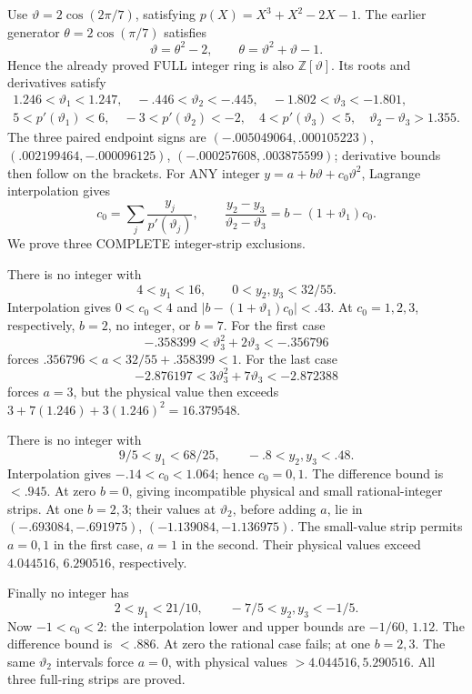 \documentclass[11pt]{article}
\begin{document}
Use \(\vartheta=2\cos(2\pi/7)\), satisfying
\(p(X)=X^3+X^2-2X-1\).
The earlier generator \(\theta=2\cos(\pi/7)\)
satisfies
\[
           \vartheta=\theta^2-2,\qquad
           \theta=\vartheta^2+\vartheta-1 .
\]
Hence the already proved FULL integer ring
is also \(\mathbb Z[\vartheta]\).
Its roots and derivatives satisfy
\[
\begin{gathered}
 1.246<\vartheta_1<1.247,\quad
 -.446<\vartheta_2<-.445,\quad
 -1.802<\vartheta_3<-1.801,\\
 5<p'(\vartheta_1)<6,\quad-3<p'(\vartheta_2)<-2,\quad
 4<p'(\vartheta_3)<5,\quad\vartheta_2-\vartheta_3>1.355 .
\end{gathered}
\]
The three paired endpoint signs are
\((-.005049064,.000105223)\),
\((.002199464,-.000096125)\),
\((-.000257608,.003875599)\);
derivative bounds then follow on the brackets.
For ANY integer \(y=a+b\vartheta+c_0\vartheta^2\),
Lagrange interpolation gives
\[
 c_0=\sum_j{\frac{y_j}{p'(\vartheta_j)}},\qquad
 {\frac{y_2-y_3}{\vartheta_2-\vartheta_3}}
                 =b-(1+\vartheta_1)c_0 .
\]
We prove three COMPLETE integer-strip exclusions.

There is no integer with
\[
              4<y_1<16,\qquad0<y_2,y_3<32/55 .
\tag{A15stripA}\label{eq:arithA15typedstripA}
\]
Interpolation gives \(0<c_0<4\) and
\(|b-(1+\vartheta_1)c_0|<.43\).
At \(c_0=1,2,3\), respectively,
\(b=2\), no integer, or \(b=7\).
For the first case
\[
          -.358399<\vartheta_3^2+2\vartheta_3<-.356796
\]
forces \(.356796<a<32/55+.358399<1\).
For the last case
\[
           -2.876197<3\vartheta_3^2+7\vartheta_3<-2.872388
\]
forces \(a=3\), but the physical value then
exceeds \(3+7(1.246)+3(1.246)^2=16.379548\).

There is no integer with
\[
                9/5<y_1<68/25,\qquad-.8<y_2,y_3<.48 .
\tag{A15stripB}\label{eq:arithA15typedstripB}
\]
Interpolation gives \(-.14<c_0<1.064\);
hence \(c_0=0,1\).
The difference bound is \(<.945\).
At zero \(b=0\), giving incompatible
physical and small rational-integer strips.
At one \(b=2,3\); their values at
\(\vartheta_2\), before adding \(a\), lie in
\((-.693084,-.691975)\),
\((-1.139084,-1.136975)\).
The small-value strip permits \(a=0,1\)
in the first case, \(a=1\) in the second.
Their physical values exceed \(4.044516\),
\(6.290516\), respectively.

Finally no integer has
\[
                   2<y_1<21/10,\qquad-7/5<y_2,y_3<-1/5 .
\tag{A15stripC}\label{eq:arithA15typedstripC}
\]
Now \(-1<c_0<2\):
the interpolation lower and upper bounds
are \(-1/60\), \(1.12\).
The difference bound is \(<.886\).
At zero the rational case fails;
at one \(b=2,3\).
The same \(\vartheta_2\) intervals force
\(a=0\), with physical values
\(>4.044516,5.290516\).
All three full-ring strips are proved.
\end{document}
